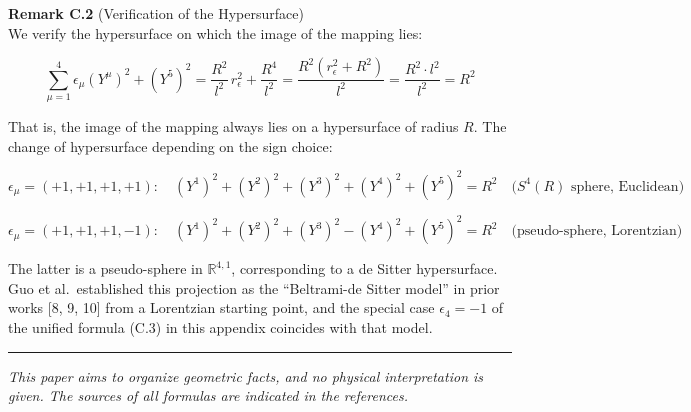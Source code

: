 \documentclass[a4paper,11pt]{article}
\theoremstyle{definition}
\begin{document}
\textbf{Remark C.2} (Verification of the Hypersurface)\\
We verify the hypersurface on which the image of the mapping lies:

\[\sum_{\mu=1}^4 \epsilon_\mu (Y^\mu)^2 + (Y^5)^2 = \frac{R^2}{l^2}\,r_\epsilon^2 + \frac{R^4}{l^2} = \frac{R^2(r_\epsilon^2 + R^2)}{l^2} = \frac{R^2 \cdot l^2}{l^2} = R^2 \tag{C.6}\]

That is, the image of the mapping always lies on a hypersurface of radius \(R\). The change of hypersurface depending on the sign choice:

\[\epsilon_\mu = (+1,+1,+1,+1): \quad (Y^1)^2+(Y^2)^2+(Y^3)^2+(Y^4)^2+(Y^5)^2 = R^2 \quad \text{($S^4(R)$ sphere, Euclidean)}\]

\[\epsilon_\mu = (+1,+1,+1,-1): \quad (Y^1)^2+(Y^2)^2+(Y^3)^2-(Y^4)^2+(Y^5)^2 = R^2 \quad \text{(pseudo-sphere, Lorentzian)}\]

The latter is a pseudo-sphere in \(\mathbb{R}^{4,1}\), corresponding to a de Sitter hypersurface. Guo et al.~established this projection as the ``Beltrami-de Sitter model'' in prior works {[}8, 9, 10{]} from a Lorentzian starting point, and the special case \(\epsilon_4 = -1\) of the unified formula (C.3) in this appendix coincides with that model.

\begin{center}\rule{0.5\linewidth}{0.5pt}\end{center}

\emph{This paper aims to organize geometric facts, and no physical interpretation is given. The sources of all formulas are indicated in the references.}
\end{document}
